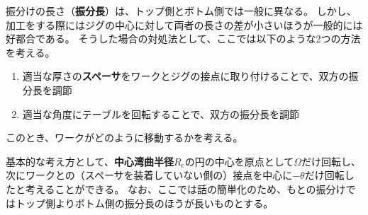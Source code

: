 

振分けの長さ（\textbf{振分長}）は、トップ側とボトム側では一般に異なる。
しかし、加工をする際にはジグの中心に対して両者の長さの差が小さいほうが一般的には好都合である。
そうした場合の対処法として、ここでは以下のような2つの方法を考える。
\begin{enumerate}
\item
適当な厚さの\textbf{スペーサ}をワークとジグの接点に取り付けることで、双方の振分長を調節
\item
適当な角度にテーブルを回転することで、双方の振分長を調節
\end{enumerate}
このとき、ワークがどのように移動するかを考える。

基本的な考え方として、\textbf{中心湾曲半径}$R_\mathrm c$の円の中心を原点として$\Omega$だけ回転し、次にワークとの（スペーサを装着していない側の）接点を中心に$-\theta$だけ回転したと考えることができる。
なお、ここでは話の簡単化のため、もとの振分けではトップ側よりボトム側の振分長のほうが長いものとする。



